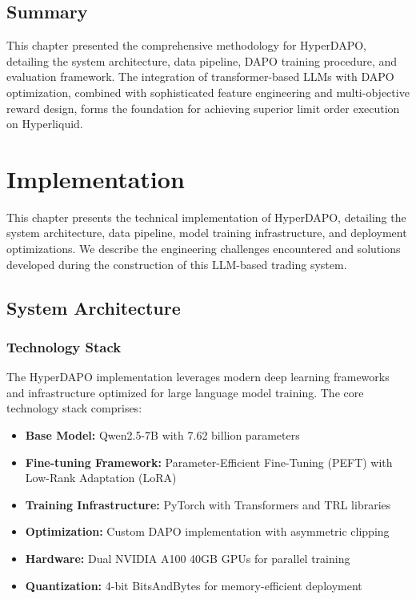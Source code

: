 \documentclass{report}
\begin{document}
\section{Summary}

This chapter presented the comprehensive methodology for HyperDAPO, detailing the system architecture, data pipeline, DAPO training procedure, and evaluation framework. The integration of transformer-based LLMs with DAPO optimization, combined with sophisticated feature engineering and multi-objective reward design, forms the foundation for achieving superior limit order execution on Hyperliquid.

\chapter{Implementation}
\label{chapter:implementation}

This chapter presents the technical implementation of HyperDAPO, detailing the system architecture, data pipeline, model training infrastructure, and deployment optimizations. We describe the engineering challenges encountered and solutions developed during the construction of this LLM-based trading system.

\section{System Architecture}

\subsection{Technology Stack}

The HyperDAPO implementation leverages modern deep learning frameworks and infrastructure optimized for large language model training. The core technology stack comprises:

\begin{itemize}
    \item \textbf{Base Model:} Qwen2.5-7B \cite{Qwen2024} with 7.62 billion parameters
    \item \textbf{Fine-tuning Framework:} Parameter-Efficient Fine-Tuning (PEFT) with Low-Rank Adaptation (LoRA)
    \item \textbf{Training Infrastructure:} PyTorch with Transformers and TRL libraries
    \item \textbf{Optimization:} Custom DAPO implementation with asymmetric clipping
    \item \textbf{Hardware:} Dual NVIDIA A100 40GB GPUs for parallel training
    \item \textbf{Quantization:} 4-bit BitsAndBytes for memory-efficient deployment
\end{itemize}
\end{document}
